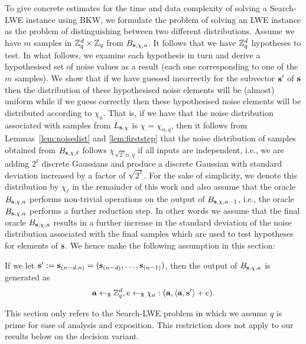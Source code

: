 To give concrete estimates for the time and data complexity of solving a Search-LWE instance using BKW, we formulate the problem of solving an LWE instance as the problem of distinguishing between two different distributions. Assume we have $m$ samples  in $\mathbb{Z}_q^d \times \mathbb{Z}_q$ from $B_{\mathbf{s},\chi,a}$. It follows that we have $\mathbb{Z}_q^d$ hypotheses to test. In what follows, we examine each hypothesis in turn and derive a hypothesised set of noise values as a result (each one corresponding to one of the $m$ samples). We show that if we have guessed incorrectly for the subvector $\mathbf{s'}$ of $\mathbf{s}$ then the distribution of these hypothesised noise elements will be (almost) uniform while if we guess correctly then these hypothesised noise elements will be distributed according to $\chi_{a}$.  That is, if we have that the noise distribution associated with samples from $L_{\mathbf{s},\chi}$ is $\chi = \chi_{\alpha,q}$, then it follows from  Lemmas~\ref{lem:noisedist} and \ref{lem:firststep} that the noise distribution of samples obtained from $B_{\mathbf{s},\chi,\ell}$ follows 
$\chi_{\sqrt{2^{\ell}}\alpha,q}$ if all inputs are independent, i.e., we are adding $2^\ell$ discrete Gaussians and produce a discrete Gaussian with standard deviation increased by a factor of $\sqrt{2^\ell}$. For the sake of simplicity, we denote this distribution by $\chi_\ell$ in the remainder of this work and also assume that the oracle $B_{\mathbf{s},\chi,a}$ performs non-trivial operations on the output of $B_{\mathbf{s},\chi,a-1}$, i.e., the oracle $B_{\mathbf{s},\chi,a}$ performs a further reduction step. In other words we assume that the final oracle $B_{\mathbf{s},\chi,a}$ results in a further increase in the standard deviation of the noise distribution associated with the final samples which are used to test hypotheses for elements of $\mathbf{s}$. We hence make the following assumption in this section:

\begin{assumption}
If we let $\mathbf{s'} := \mathbf{s}_{(n-d,n)} = (\mathbf{s}_{(n-d)},\ldots,\mathbf{s}_{(n-1)})$, then the output of ${B_{\mathbf{s},\chi,a}}$  is generated as $$\mathbf{a} \leftarrow_{\$} \mathbb{Z}_q^d, e \leftarrow_{\$} \chi_{a}: (\mathbf{a},\langle {\ensuremath{\mathbf{a}}},{\mathbf{s'}}\rangle + e).$$
\end{assumption}

\begin{remark}
This section only refers to the Search-LWE problem in which we assume $q$ is prime for ease of analysis and exposition. This restriction does not apply to our results below on the decision variant.
\end{remark}

